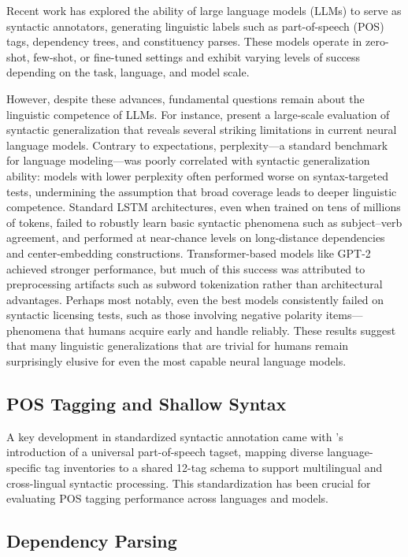 Recent work has explored the ability of large language models (LLMs) to serve as syntactic annotators, generating linguistic labels such as part-of-speech (POS) tags, dependency trees, and constituency parses. These models operate in zero-shot, few-shot, or fine-tuned settings and exhibit varying levels of success depending on the task, language, and model scale.

However, despite these advances, fundamental questions remain about the linguistic competence of LLMs. For instance, \citet{hu2020systematic} present a large-scale evaluation of syntactic generalization that reveals several striking limitations in current neural language models. Contrary to expectations, perplexity—a standard benchmark for language modeling—was poorly correlated with syntactic generalization ability: models with lower perplexity often performed worse on syntax-targeted tests, undermining the assumption that broad coverage leads to deeper linguistic competence. Standard LSTM architectures, even when trained on tens of millions of tokens, failed to robustly learn basic syntactic phenomena such as subject–verb agreement, and performed at near-chance levels on long-distance dependencies and center-embedding constructions. Transformer-based models like GPT-2 achieved stronger performance, but much of this success was attributed to preprocessing artifacts such as subword tokenization rather than architectural advantages. Perhaps most notably, even the best models consistently failed on syntactic licensing tests, such as those involving negative polarity items—phenomena that humans acquire early and handle reliably. These results suggest that many linguistic generalizations that are trivial for humans remain surprisingly elusive for even the most capable neural language models.

\subsection{POS Tagging and Shallow Syntax}

A key development in standardized syntactic annotation came with \citet{petrov2012universal}'s introduction of a universal part-of-speech tagset, mapping diverse language-specific tag inventories to a shared 12-tag schema to support multilingual and cross-lingual syntactic processing. This standardization has been crucial for evaluating POS tagging performance across languages and models.

\subsection{Dependency Parsing}


